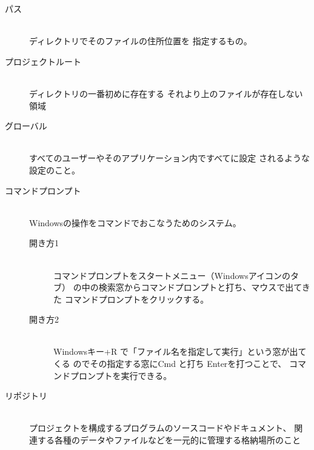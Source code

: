 \documentclass{ltjsarticle}
\begin{document}
\begin{description}
  \item [パス] ~\\
    ディレクトリでそのファイルの住所位置を
    指定するもの。
  \item [プロジェクトルート] ~\\
    ディレクトリの一番初めに存在する
    それより上のファイルが存在しない領域
  \item [グローバル] ~\\
    すべてのユーザーやそのアプリケーション内ですべてに設定
    されるような設定のこと。
  \item [コマンドプロンプト] ~\\
    Windowsの操作をコマンドでおこなうためのシステム。
    \begin{description}
      \item[開き方1] ~\\
      コマンドプロンプトをスタートメニュー（Windowsアイコンのタブ）
      の中の検索窓からコマンドプロンプトと打ち、マウスで出てきた
      コマンドプロンプトをクリックする。
      \item[開き方2] ~\\
      Windowsキー+R で「ファイル名を指定して実行」という窓が出てくる
      のでその指定する窓にCmd と打ち Enterを打つことで、
      コマンドプロンプトを実行できる。
    \end{description}

  \item [リポジトリ] ~\\
    プロジェクトを構成するプログラムのソースコードやドキュメント、
    関連する各種のデータやファイルなどを一元的に管理する格納場所のこと
\end{description}
\end{document}
